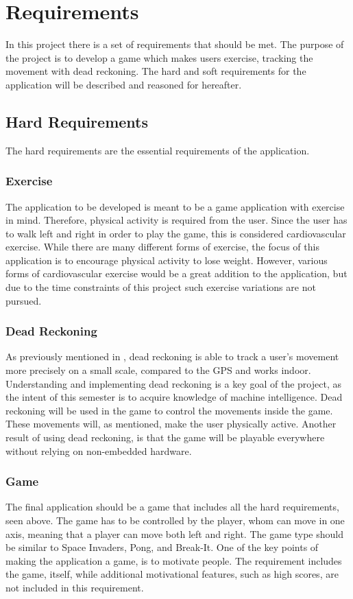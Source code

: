 \section{Requirements}\label{section:requirements}
In this project there is a set of requirements that should be met.
The purpose of the project is to develop a game which makes users exercise, tracking the movement with dead reckoning.
The hard and soft requirements for the application will be described and reasoned for hereafter.

\subsection{Hard Requirements}
The hard requirements are the essential requirements of the application.
\subsubsection*{Exercise}
The application to be developed is meant to be a game application with exercise in mind. 
Therefore, physical activity is required from the user.
Since the user has to walk left and right in order to play the game, this is considered cardiovascular exercise.
While there are many different forms of exercise, the focus of this application is to encourage physical activity to lose weight.
However, various forms of cardiovascular exercise would be a great addition to the application, but due to the time constraints of this project such exercise variations are not pursued. 

\subsubsection*{Dead Reckoning}
As previously mentioned in , dead reckoning is able to track a user's movement more precisely on a small scale, compared to the GPS and works indoor.
Understanding and implementing dead reckoning is a key goal of the project, as the intent of this semester is to acquire knowledge of machine intelligence.
Dead reckoning will be used in the game to control the movements inside the game.
These movements will, as mentioned, make the user physically active.
Another result of using dead reckoning, is that the game will be playable everywhere without relying on non-embedded hardware.

\subsubsection*{Game}
The final application should be a game that includes all the hard requirements, seen above. 
The game has to be controlled by the player, whom can move in one axis, meaning that a player can move both left and right.
The game type should be similar to Space Invaders, Pong, and Break-It.
One of the key points of making the application a game, is to motivate people. 
The requirement includes the game, itself, while additional motivational features, such as high scores, are not included in this requirement.

